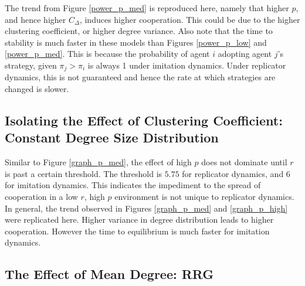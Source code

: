 The trend from Figure \ref{power_p_med} is reproduced here, namely that higher $p$, and hence higher $C_\Delta$, induces higher cooperation. This could be due to the higher clustering coefficient, or higher degree variance. Also note that the time to stability is much faster in these models than Figures \ref{power_p_low} and \ref{power_p_med}. This is because the probability of agent $i$ adopting agent $j$'s strategy, given $\pi_j > \pi_i$ is always 1 under imitation dynamics. Under replicator dynamics, this is not guaranteed and hence the rate at which strategies are changed is slower. \\


\subsection{Isolating the Effect of Clustering Coefficient: Constant Degree Size Distribution}

\FloatBarrier
 


\FloatBarrier

 Similar to Figure \ref{graph_p_med}, the effect of high $p$ does not dominate until $r$ is past a certain threshold. The threshold is $5.75$ for replicator dynamics, and $6$ for imitation dynamics. This indicates the impediment to the spread of cooperation in a low $r$, high $p$ environment is not unique to replicator dynamics. \\
 
 In general, the trend observed in Figures \ref{graph_p_med} and \ref{graph_p_high} were replicated here. Higher variance in degree distribution leads to higher cooperation. However the time to equilibrium is much faster for imitation dynamics. \\
 
\subsection{The Effect of Mean Degree: RRG}

